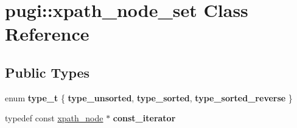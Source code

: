 \hypertarget{classpugi_1_1xpath__node__set}{\section{pugi\-:\-:xpath\-\_\-node\-\_\-set Class Reference}
\label{classpugi_1_1xpath__node__set}
}
\subsection*{Public Types}
\begin{DoxyCompactItemize}
\item 
enum {\bfseries type\-\_\-t} \{ {\bfseries type\-\_\-unsorted}, 
{\bfseries type\-\_\-sorted}, 
{\bfseries type\-\_\-sorted\-\_\-reverse}
 \}
\item 
\hypertarget{classpugi_1_1xpath__node__set_a6987510e88cea4a396d186285c174de6}{typedef const \hyperlink{classpugi_1_1xpath__node}{xpath\-\_\-node} $\ast$ {\bfseries const\-\_\-iterator}}\label{classpugi_1_1xpath__node__set_a6987510e88cea4a396d186285c174de6}

\end{DoxyCompactItemize}
